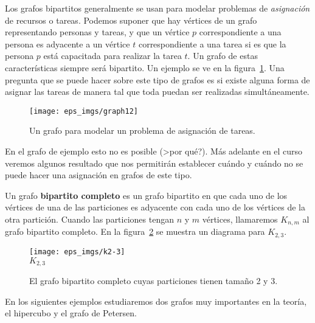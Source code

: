 \begin{ejemplo}
Los grafos bipartitos generalmente se usan para modelar problemas de \emph{asignación} de recursos o tareas.
Podemos suponer que hay vértices de un grafo representando personas y tareas, y que un vértice $p$ correspondiente a una persona es adyacente a un vértice $t$ correspondiente a una tarea si es que la persona $p$ está capacitada para realizar la tarea $t$.
Un grafo de estas características siempre será bipartito.
Un ejemplo se ve en la figura~\ref{fig:job-ass}.
Una pregunta que se puede hacer sobre este tipo de grafos es si existe alguna forma de asignar las tareas de manera tal que toda puedan ser realizadas simultáneamente.
\begin{figure}[h!]
\centering
\texttt{[image: eps\_imgs/graph12]}
\caption{Un grafo para modelar un problema de asignación de tareas.}
\label{fig:job-ass}
\end{figure} 
En el grafo de ejemplo esto no es posible (>por qué?).
Más adelante en el curso veremos algunos resultado que nos permitirán establecer cuándo y cuándo no se puede hacer una asignación en grafos de este tipo.
\end{ejemplo}

\begin{definicion}
Un grafo {\bf bipartito completo} es un grafo bipartito en que cada uno de los vértices de una de las particiones es adyacente con cada uno de los vértices de la otra partición.
Cuando las particiones tengan $n$ y $m$ vértices, llamaremos $K_{n,m}$ al grafo bipartito completo.
En la figura~\ref{fig:k2-3} se muestra un diagrama para $K_{2,3}$.
\begin{figure}[h!]
\centering
\texttt{[image: eps\_imgs/k2-3]}\\
$K_{2,3}$
\caption{El grafo bipartito completo cuyas particiones tienen tamaño 2 y 3.}
\label{fig:k2-3}
\end{figure}
\end{definicion}

En los siguientes ejemplos estudiaremos dos grafos muy importantes en la teoría, el hipercubo y el grafo de Petersen.

